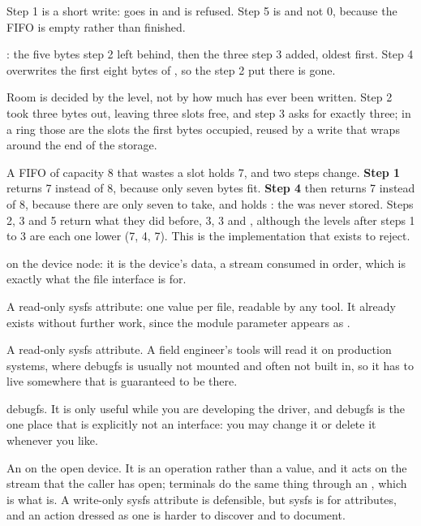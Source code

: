 \noindent Step 1 is a short write:  goes in and  is refused. Step 5 is
 and not 0, because the FIFO is empty rather than finished.

 : the five bytes step 2 left behind, then the three step 3 added, oldest
first. Step 4 overwrites the first eight bytes of , so the  step 2 put there is
gone.

 Room is decided by the level, not by how much has ever been written. Step 2 took three
bytes out, leaving three slots free, and step 3 asks for exactly three; in a ring those are the
slots the first bytes occupied, reused by a write that wraps around the end of the storage.

 A FIFO of capacity 8 that wastes a slot holds 7, and two steps change. \textbf{Step 1}
returns 7 instead of 8, because only seven bytes fit. \textbf{Step 4} then returns 7 instead of 8,
because there are only seven to take, and  holds : the  was never
stored. Steps 2, 3 and 5 return what they did before, 3, 3 and , although the levels
after steps 1 to 3 are each one lower (7, 4, 7). This is the implementation that
 exists to reject.


  on the device node: it is the device's data, a stream consumed in order,
which is exactly what the file interface is for.

 A read-only sysfs attribute: one value per file, readable by any tool. It already exists
without further work, since the  module parameter appears as
.

 A read-only sysfs attribute. A field engineer's tools will read it on production
systems, where debugfs is usually not mounted and often not built in, so it has to live somewhere
that is guaranteed to be there.

 debugfs. It is only useful while you are developing the driver, and debugfs is the one
place that is explicitly not an interface: you may change it or delete it whenever you like.

 An  on the open device. It is an operation rather than a value, and it acts
on the stream that the caller has open; terminals do the same thing through an , which
is what  is. A write-only sysfs attribute is defensible, but sysfs is for attributes,
and an action dressed as one is harder to discover and to document.

